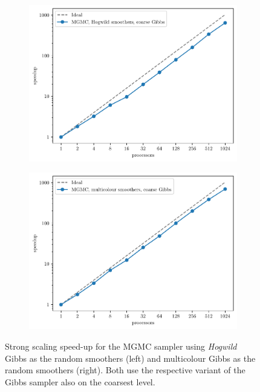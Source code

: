 \documentclass[
fontsize=11pt,
paper=a4,
numbers=noenddot
]{scrartcl}
\begin{document}
\begin{figure}[htbp]
    \centering
    \begin{subfigure}[b]{0.49\textwidth}
        \centering
        \includegraphics[width=\textwidth]{plots/strong_scaling_mgmc+hw+gibbs_4097x4097.pdf}
    \end{subfigure}
    \hfill
    \begin{subfigure}[b]{0.49\textwidth}
        \centering
        \includegraphics[width=\textwidth]{plots/strong_scaling_mgmc+mg+gibbs_4097x4097.pdf}
    \end{subfigure}
    \caption{Strong scaling speed-up for the MGMC sampler using \emph{Hogwild} Gibbs as the random smoothers (left) and multicolour Gibbs as the random smoothers (right). Both use the respective variant of the Gibbs sampler also on the coarsest level.}
    \label{fig:2d_structured_mgmc_ss}
\end{figure}
\end{document}
